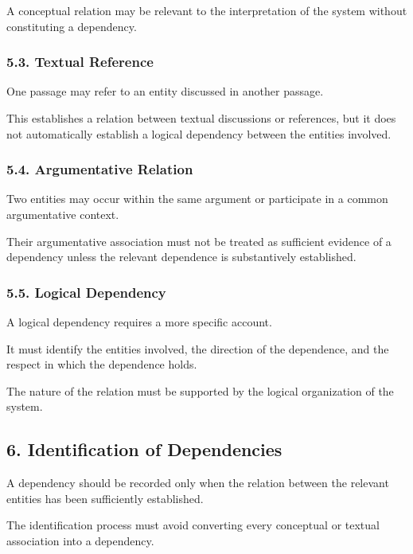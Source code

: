 A conceptual relation may be relevant
to the interpretation of the system
without constituting a dependency.

\subsubsection*{5.3. Textual Reference}

One passage may refer to an entity
discussed in another passage.

This establishes a relation between
textual discussions or references,
but it does not automatically
establish a logical dependency
between the entities involved.

\subsubsection*{5.4. Argumentative Relation}

Two entities may occur within
the same argument or participate
in a common argumentative context.

Their argumentative association
must not be treated as sufficient
evidence of a dependency unless
the relevant dependence is
substantively established.

\subsubsection*{5.5. Logical Dependency}

A logical dependency requires
a more specific account.

It must identify the entities
involved, the direction of the
dependence, and the respect
in which the dependence holds.

The nature of the relation must
be supported by the logical
organization of the system.


\subsection*{6. Identification of Dependencies}

A dependency should be recorded
only when the relation between
the relevant entities has been
sufficiently established.

The identification process must
avoid converting every conceptual
or textual association into
a dependency.

